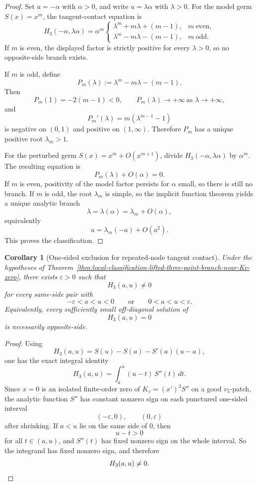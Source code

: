 \documentclass[11pt,a4paper]{amsart}
\theoremstyle{plain}
\newtheorem{corollary}[theorem]{Corollary}
\theoremstyle{definition}
\begin{document}
\begin{proof}
Set $a=-\alpha$ with $\alpha>0$, and write $u=\lambda\alpha$ with
$\lambda>0$. For the model germ $S(x)=x^m$, the tangent-contact equation is
\[
H_3(-\alpha,\lambda\alpha)
=
\alpha^m
\begin{cases}
\lambda^m+m\lambda+(m-1),& m\ \text{even},\\[0.5ex]
\lambda^m-m\lambda-(m-1),& m\ \text{odd}.
\end{cases}
\]
If $m$ is even, the displayed factor is strictly positive for every
$\lambda>0$, so no opposite-side branch exists.

If $m$ is odd, define
\[
P_m(\lambda):=\lambda^m-m\lambda-(m-1).
\]
Then
\[
P_m(1)=-2(m-1)<0,
\qquad
P_m(\lambda)\to+\infty\ \text{as }\lambda\to+\infty,
\]
and
\[
P_m'(\lambda)=m(\lambda^{m-1}-1)
\]
is negative on $(0,1)$ and positive on $(1,\infty)$. Therefore $P_m$
has a unique positive root $\lambda_m>1$.

For the perturbed germ $S(x)=x^m+O(x^{m+1})$, divide $H_3(-\alpha,\lambda\alpha)$
by $\alpha^m$. The resulting equation is
\[
P_m(\lambda)+O(\alpha)=0.
\]
If $m$ is even, positivity of the model factor persists for $\alpha$ small,
so there is still no branch. If $m$ is odd, the root $\lambda_m$ is simple,
so the implicit function theorem yields a unique analytic branch
\[
\lambda=\lambda(\alpha)=\lambda_m+O(\alpha),
\]
equivalently
\[
u=\lambda_m(-a)+O(a^2).
\]
This proves the classification.
\end{proof}

\begin{corollary}[One-sided exclusion for repeated-node tangent contact]
\label{cor:one-sided-exclusion-repeated-node-tangent-contact}
Under the hypotheses of
Theorem~\ref{thm:local-classification-lifted-three-point-branch-near-Kv-zero},
there exists $\varepsilon>0$ such that
\[
H_3(a,u)\neq 0
\]
for every same-side pair with
\[
-\varepsilon<a<u<0
\qquad\text{or}\qquad
0<a<u<\varepsilon.
\]
Equivalently, every sufficiently small off-diagonal solution of
\[
H_3(a,u)=0
\]
is necessarily opposite-side.
\end{corollary}

\begin{proof}
Using
\[
H_3(a,u)=S(u)-S(a)-S'(a)(u-a),
\]
one has the exact integral identity
\[
H_3(a,u)=\int_a^u (u-t)\,S''(t)\,dt.
\]
Since $x=0$ is an isolated finite-order zero of $K_v=(x')^3S''$ on a good
$v_5$-patch, the analytic function $S''$ has constant nonzero sign on each
punctured one-sided interval
\[
(-\varepsilon,0),
\qquad
(0,\varepsilon)
\]
after shrinking. If $a<u$ lie on the same side of $0$, then
\[
u-t>0
\]
for all $t\in(a,u)$, and $S''(t)$ has fixed nonzero sign on the whole interval.
So the integrand has fixed nonzero sign, and therefore
\[
H_3(a,u)\neq 0.
\qedhere
\]
\end{proof}
\end{document}
